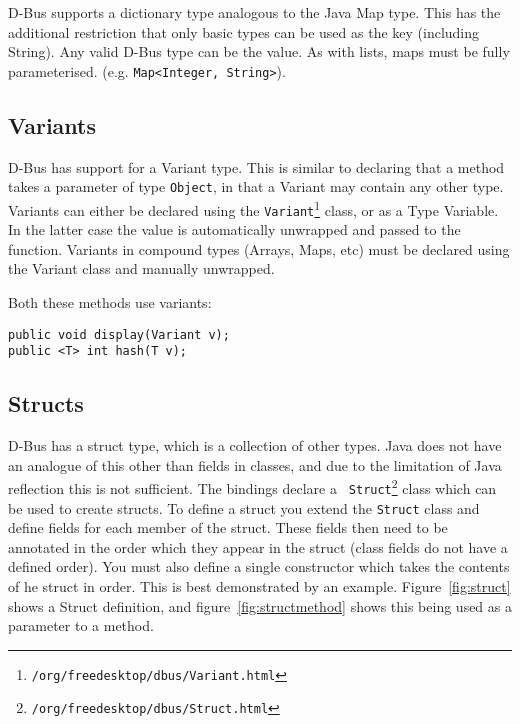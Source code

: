 \documentclass[a4paper,12pt]{article}
\begin{document}
D-Bus supports a dictionary type analogous to the Java Map type. This
has the additional restriction that only basic types can be used as
the key (including String). Any valid D-Bus type can be the value. As
with lists, maps must be fully parameterised. (e.g.
\verb&Map<Integer, String>&).

\subsection{Variants}

D-Bus has support for a Variant type. This is similar to declaring that a method takes a parameter of type {\tt Object}, in that a Variant may contain any other type. Variants can either be declared using the {\tt Variant\footnote{\javadocroot/org/freedesktop/dbus/Variant.html}} class, or as a Type Variable. In the latter case the value is automatically unwrapped and passed to the function. Variants in compound types (Arrays, Maps, etc) must be declared using the Variant class and manually unwrapped.

Both these methods use variants:

\begin{verbatim}
public void display(Variant v);
public <T> int hash(T v);
\end{verbatim}

\subsection{Structs}

D-Bus has a struct type, which is a collection of other types. Java
does not have an analogue of this other than fields in classes, and
due to the limitation of Java reflection this is not sufficient. The
bindings declare a {\tt
Struct\footnote{\javadocroot/org/freedesktop/dbus/Struct.html}} class which can be used to create structs.
To define a struct you extend the {\tt Struct} class and define fields for each member of the struct.
These fields then need to be annotated in the order which they appear in the struct (class fields do not have a defined order). You must also define a single constructor which takes the contents of he struct in order. This is best demonstrated by an example.
Figure~\ref{fig:struct} shows a Struct definition, and
figure~\ref{fig:structmethod} shows this being used as a parameter
to a method.
\end{document}
